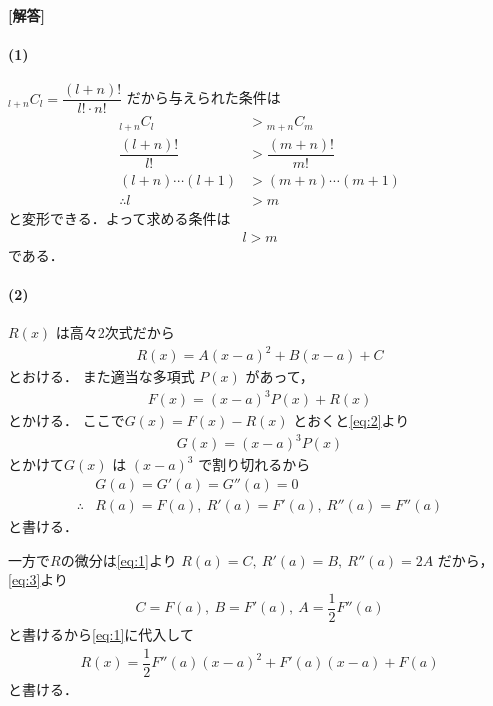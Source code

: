 \documentclass[../../main.tex]{subfiles}
\begin{document}
\begin{oframed}
  
\end{oframed}

{\bf [解答]}
\paragraph{(1)}
$_{l+n}C_l = \dfrac{(l+n)!}{l!\cdot n!}$ だから与えられた条件は
\begin{align}
  {}_{l+n}C_l       &> {}_{m+n}C_m \\
  \dfrac{(l+n)!}{l!} &> \dfrac{(m+n)!}{m!} \\
  (l+n)\cdots(l+1)  &> (m+n)\cdots(m+1) \\
  \therefore
  l&>m
\end{align}
と変形できる．よって求める条件は
\begin{align}
  l > m
\end{align}
である．

\paragraph{(2)}
$R(x)$ は高々2次式だから
\begin{align}
  R(x)=A(x-a)^2+B(x-a)+C \label{eq:1}
\end{align}
とおける．
また適当な多項式 $P(x)$ があって，
\begin{align}
  F(x)=(x-a)^3P(x)+R(x) \label{eq:2}
\end{align}
とかける．
ここで$G(x)=F(x)-R(x)$ とおくと\cref{eq:2}より
\begin{align}
  G(x) = (x-a)^3P(x)
\end{align}
とかけて$G(x)$ は $(x-a)^3$ で割り切れるから
\begin{align}
  & G(a)=G'(a)=G''(a)=0 \\
  \therefore
  & R(a)=F(a),\ R'(a)=F'(a),\ R''(a)=F''(a) \label{eq:3}
\end{align}
と書ける．

一方で$R$の微分は\cref{eq:1}より
$R(a)=C,\ R'(a)=B,\ R''(a)=2A$ だから，\cref{eq:3}より
\begin{align}
  C=F(a),\ B=F'(a),\ A=\dfrac{1}{2}F''(a)
\end{align}
と書けるから\cref{eq:1}に代入して
\begin{align}
  R(x)=\dfrac{1}{2}F''(a)(x-a)^2+F'(a)(x-a)+F(a)
\end{align}
と書ける．

\newpage
\end{document}
